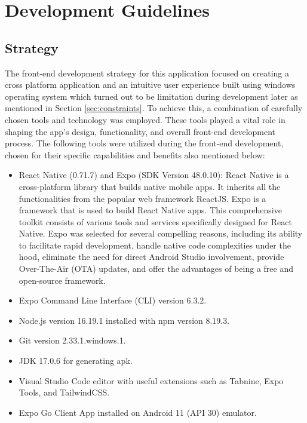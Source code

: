 \section{Development Guidelines}\label{sec:guidelines}
\subsection{Strategy}
The front-end development strategy for this application focused on creating a cross platform application and an intuitive user experience built using windows operating system which turned out to be limitation during development later as mentioned in Section \ref{sec:constraints}. To achieve this, a combination of carefully chosen tools and technology was employed. These tools played a vital role in shaping the app's design, functionality, and overall front-end development process. The following tools were utilized during the front-end development, chosen for their specific capabilities and benefits also mentioned below:
\begin{itemize}
    \item React Native (0.71.7) and Expo (SDK Version 48.0.10): React Native is a cross-platform library that builds native mobile apps. It inherits all the functionalities from the popular web framework ReactJS. Expo is a framework that is used to build React Native apps. This comprehensive toolkit consists of various tools and services specifically designed for React Native. Expo was selected for several compelling reasons, including its ability to facilitate rapid development, handle native code complexities under the hood, eliminate the need for direct Android Studio involvement, provide Over-The-Air (OTA) updates, and offer the advantages of being a free and open-source framework. \cite{hutri2023comparison}
    \item Expo Command Line Interface (CLI) version 6.3.2.
    \item Node.js version 16.19.1 installed with npm version 8.19.3.
    \item Git version 2.33.1.windows.1.
    \item JDK 17.0.6 for generating apk.
    \item Visual Studio Code editor with useful extensions such as Tabnine, Expo Tools, and TailwindCSS.
    \item Expo Go Client App installed on Android 11 (API 30) emulator.
\end{itemize}
